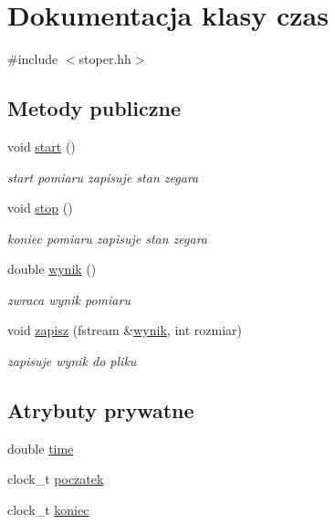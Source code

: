 \hypertarget{classczas}{\section{\-Dokumentacja klasy czas}
\label{classczas}
}


{\ttfamily \#include $<$stoper.\-hh$>$}

\subsection*{\-Metody publiczne}
\begin{DoxyCompactItemize}
\item 
void \hyperlink{classczas_a1e4c793526806f459e7f5c8c4a3ae29f}{start} ()
\begin{DoxyCompactList}\small\item\em start pomiaru zapisuje stan zegara \end{DoxyCompactList}\item 
void \hyperlink{classczas_a27f391e3c6bfb1f15f97c61bf403eb2d}{stop} ()
\begin{DoxyCompactList}\small\item\em koniec pomiaru zapisuje stan zegara \end{DoxyCompactList}\item 
double \hyperlink{classczas_a253df7797ca3cc3447d24c3c9477768e}{wynik} ()
\begin{DoxyCompactList}\small\item\em zwraca wynik pomiaru \end{DoxyCompactList}\item 
void \hyperlink{classczas_a53e5d67a7dd77239f2ef6ae0866e0596}{zapisz} (fstream \&\hyperlink{classczas_a253df7797ca3cc3447d24c3c9477768e}{wynik}, int rozmiar)
\begin{DoxyCompactList}\small\item\em zapisuje wynik do pliku \end{DoxyCompactList}\end{DoxyCompactItemize}
\subsection*{\-Atrybuty prywatne}
\begin{DoxyCompactItemize}
\item 
double \hyperlink{classczas_a1348fd4948270410b3087bb0318bd147}{time}
\item 
clock\-\_\-t \hyperlink{classczas_a3e75d47bf9beee497b56997b0b7be45c}{poczatek}
\item 
clock\-\_\-t \hyperlink{classczas_a65324dff284c101f2594b0b05b30399e}{koniec}
\end{DoxyCompactItemize}


